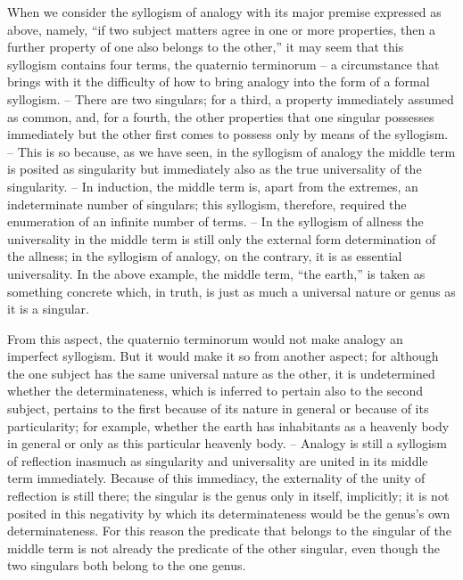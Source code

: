 When we consider the syllogism of analogy with its major premise
expressed as above, namely, “if two subject matters agree in one or more
properties, then a further property of one also belongs to the other,” it may
seem that this syllogism contains four terms, the quaternio terminorum –
a circumstance that brings with it the difficulty of how to bring analogy
into the form of a formal syllogism. – There are two singulars; for a third,
a property immediately assumed as common, and, for a fourth, the other
properties that one singular possesses immediately but the other first comes
to possess only by means of the syllogism. – This is so because, as we have
seen, in the syllogism of analogy the middle term is posited as singularity but
immediately also as the true universality of the singularity. – In induction,
the middle term is, apart from the extremes, an indeterminate number of
singulars; this syllogism, therefore, required the enumeration of an infinite
number of terms. – In the syllogism of allness the universality in the
middle term is still only the external form determination of the allness;
in the syllogism of analogy, on the contrary, it is as essential universality.
In the above example, the middle term, “the earth,” is taken as something
concrete which, in truth, is just as much a universal nature or genus as it is
a singular.

From this aspect, the quaternio terminorum would not make analogy
an imperfect syllogism. But it would make it so from another aspect; for
although the one subject has the same universal nature as the other, it is
undetermined whether the determinateness, which is inferred to pertain
also to the second subject, pertains to the first because of its nature in
general or because of its particularity; for example, whether the earth has
inhabitants as a heavenly body in general or only as this particular heavenly
body. – Analogy is still a syllogism of reflection inasmuch as singularity
and universality are united in its middle term immediately. Because of this
immediacy, the externality of the unity of reflection is still there; the singular
is the genus only in itself, implicitly; it is not posited in this negativity by
which its determinateness would be the genus’s own determinateness. For
this reason the predicate that belongs to the singular of the middle term
is not already the predicate of the other singular, even though the two
singulars both belong to the one genus.

